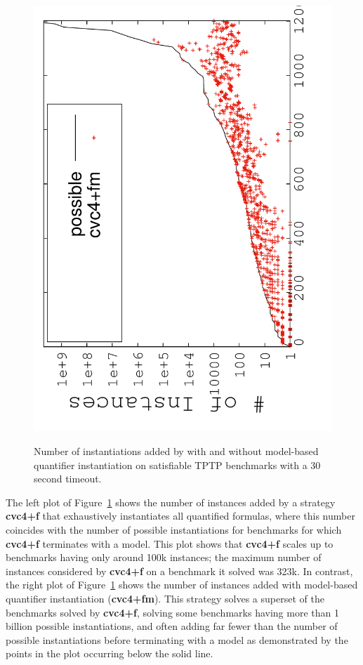 \documentclass{easychair}
\begin{document}
\begin{figure}[t]
{\includegraphics[scale=.22, angle=270]{model-size-mbqi.pdf} 
}%
\caption{
Number of instantiations added by \cvc with and without model-based quantifier instantiation
on satisfiable TPTP benchmarks with a 30 second timeout.
}
\label{fig:inst-mbqi}
\end{figure}

The left plot of Figure~\ref{fig:inst-mbqi} shows the number of instances
added by a strategy {\bf cvc4+f} that exhaustively instantiates all quantified formulas,
where this number coincides with the number of possible instantiations for benchmarks for which
{\bf cvc4+f} terminates with a model.
This plot shows that {\bf cvc4+f} scales up to benchmarks having only around 100k instances;
the maximum number of instances considered by {\bf cvc4+f} on a benchmark it solved was 323k.
In contrast, the right plot of Figure~\ref{fig:inst-mbqi} shows the number of instances
added with model-based quantifier instantiation ({\bf cvc4+fm}).
This strategy solves a superset of the benchmarks solved by {\bf cvc4+f},
solving some benchmarks having more than 1 billion possible instantiations,
and often adding far fewer than the number of possible instantiations before terminating with a model
as demonstrated by the points in the plot occurring below the solid line.
\end{document}
